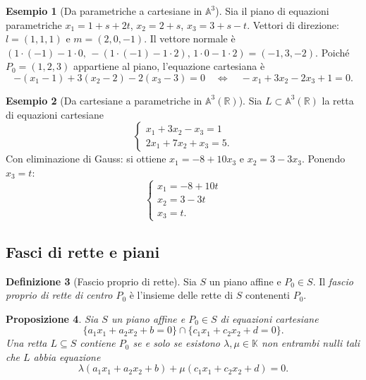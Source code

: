 \documentclass[11pt, a4paper]{book}
\theoremstyle{definition}
\newtheorem{definizione}{Definizione}[section]
\newtheorem{esempio}[definizione]{Esempio}
\theoremstyle{plain}
\newtheorem{proposizione}[definizione]{Proposizione}
\theoremstyle{remark}
\newcommand{\R}{\mathbb{R}}
\newcommand{\K}{\mathbb{K}}
\begin{document}
\begin{exbox}
\begin{esempio}[Da parametriche a cartesiane in $\mathbb{A}^3$]
Sia il piano di equazioni parametriche $x_1 = 1 + s + 2t$, $x_2 = 2 + s$, $x_3 = 3 + s - t$. Vettori di direzione: $l = (1,1,1)$ e $m = (2,0,-1)$. Il vettore normale è $(1\cdot(-1) - 1\cdot 0,\, -(1\cdot(-1)-1\cdot 2),\, 1\cdot 0 - 1\cdot 2) = (-1, 3, -2)$. Poiché $P_0 = (1,2,3)$ appartiene al piano, l'equazione cartesiana è
\[
  -(x_1-1) + 3(x_2-2) - 2(x_3-3) = 0 \quad\Longleftrightarrow\quad -x_1 + 3x_2 - 2x_3 + 1 = 0.
\]
\end{esempio}
\end{exbox}

\begin{exbox}
\begin{esempio}[Da cartesiane a parametriche in $\mathbb{A}^3(\R)$]
\label{es:cart-param-a3}
Sia $L \subset \mathbb{A}^3(\R)$ la retta di equazioni cartesiane
\[
  \begin{cases} x_1 + 3x_2 - x_3 = 1 \\ 2x_1 + 7x_2 + x_3 = 5. \end{cases}
\]
Con eliminazione di Gauss: si ottiene $x_1 = -8 + 10x_3$ e $x_2 = 3 - 3x_3$. Ponendo $x_3 = t$:
\[
  \begin{cases} x_1 = -8 + 10t \\ x_2 = 3 - 3t \\ x_3 = t. \end{cases}
\]
\end{esempio}
\end{exbox}

\subsection{Fasci di rette e piani}

\begin{defbox}
\begin{definizione}[Fascio proprio di rette]
Sia $S$ un piano affine e $P_0 \in S$. Il \emph{fascio proprio di rette di centro $P_0$} è l'insieme delle rette di $S$ contenenti $P_0$.
\end{definizione}
\end{defbox}

\begin{proposizione}
\label{prop:fascio-proprio}
Sia $S$ un piano affine e $P_0 \in S$ di equazioni cartesiane
\[
  \{a_1 x_1 + a_2 x_2 + b = 0\} \cap \{c_1 x_1 + c_2 x_2 + d = 0\}.
\]
Una retta $L \subseteq S$ contiene $P_0$ se e solo se esistono $\lambda, \mu \in \K$ non entrambi nulli tali che $L$ abbia equazione
\[
  \lambda(a_1 x_1 + a_2 x_2 + b) + \mu(c_1 x_1 + c_2 x_2 + d) = 0.
\]
\end{proposizione}
\end{document}
